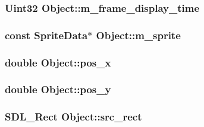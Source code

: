 \subsubsection[{m\+\_\+frame\+\_\+display\+\_\+time}]{\setlength{\rightskip}{0pt plus 5cm}Uint32 Object\+::m\+\_\+frame\+\_\+display\+\_\+time\hspace{0.3cm}{\ttfamily [protected]}}\label{class_object_a76a3f8ee17746de53b8f162b5df2c837}
\hypertarget{class_object_a07c5c7138bb081dacbe9ddfb0295ced7}{}
\subsubsection[{m\+\_\+sprite}]{\setlength{\rightskip}{0pt plus 5cm}const {\bf Sprite\+Data}$\ast$ Object\+::m\+\_\+sprite\hspace{0.3cm}{\ttfamily [protected]}}\label{class_object_a07c5c7138bb081dacbe9ddfb0295ced7}
\hypertarget{class_object_a1f71a5693147aecc701db4ab51d3edcc}{}
\subsubsection[{pos\+\_\+x}]{\setlength{\rightskip}{0pt plus 5cm}double Object\+::pos\+\_\+x}\label{class_object_a1f71a5693147aecc701db4ab51d3edcc}
\hypertarget{class_object_a986134c27f3e74ba41a4d28e20b183a9}{}
\subsubsection[{pos\+\_\+y}]{\setlength{\rightskip}{0pt plus 5cm}double Object\+::pos\+\_\+y}\label{class_object_a986134c27f3e74ba41a4d28e20b183a9}
\hypertarget{class_object_aef9bec0e47c5d8cc04145de236881f47}{}
\subsubsection[{src\+\_\+rect}]{\setlength{\rightskip}{0pt plus 5cm}S\+D\+L\+\_\+\+Rect Object\+::src\+\_\+rect}\label{class_object_aef9bec0e47c5d8cc04145de236881f47}
\hypertarget{class_object_a77c2ada7189758c530ab24a7b366d3fb}{}
